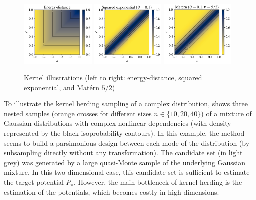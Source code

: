 \begin{figure}[!h]
\begin{center}
    \includegraphics[width=0.32\textwidth]{part2/figures/DCE/numerical_experiments/energy_kernel.jpg}
    \includegraphics[width=0.32\textwidth]{part2/figures/DCE/numerical_experiments/gaussian_kernel.jpg}
    \includegraphics[width=0.32\textwidth]{part2/figures/DCE/numerical_experiments/matern_kernel.jpg}
\end{center}
\caption{Kernel illustrations (left to right: energy-distance, squared exponential, and Matérn $5/2$)} \label{fig:kernels}
\end{figure}

To illustrate the kernel herding sampling of a complex distribution,  shows three nested samples (orange crosses for different sizes $n\in\{10, 20, 40\}$) of a mixture of Gaussian distributions with complex nonlinear dependencies (with density represented by the black isoprobability contours). 
In this example, the method seems to build a parsimonious design between each mode of the distribution (by subsampling directly without any transformation). 
The candidate set (in light grey) was generated by a large quasi-Monte sample of the underlying Gaussian mixture. 
In this two-dimensional case, this candidate set is sufficient to estimate the target potential $P_{\pi}$. 
However, the main bottleneck of kernel herding is the estimation of the potentials, which becomes costly in high dimensions.

